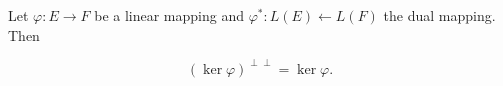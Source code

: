Let $\varphi: E \rightarrow F$ be a linear mapping and $\varphi^*: L(E) \leftarrow L(F)$ the dual mapping. Then

$$(\ker \varphi)^{\perp\perp} = \ker \varphi.$$
